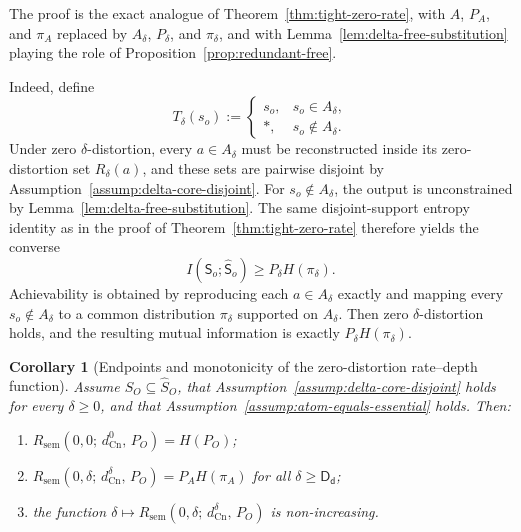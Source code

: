 \documentclass[journal,onecolumn]{IEEEtran}
\makeatletter
\newcommand{\Cn}{\text{Cn}}
\newtheorem{corollary}{Corollary}[section]
\numberwithin{equation}{section}
\renewenvironment{proof}[1][\proofname]{\par
  \pushQED{\qed}%
  \normalfont \topsep6\p@\@plus6\p@\relax
  \trivlist
  \item[\hskip\labelsep
        \itshape
    #1\@addpunct{.}]\ignorespaces
}{%
  \popQED\endtrivlist\@endpefalse
}
\makeatother
\begin{document}
\begin{proof}[Proof sketch]
The proof is the exact analogue of
Theorem~\ref{thm:tight-zero-rate}, with
\(A\), \(P_A\), and \(\pi_A\) replaced by
\(A_\delta\), \(P_\delta\), and \(\pi_\delta\), and with
Lemma~\ref{lem:delta-free-substitution} playing the role of
Proposition~\ref{prop:redundant-free}.

Indeed, define
\[
  T_\delta(s_o)
  :=
  \begin{cases}
    s_o, & s_o\in A_\delta,\\
    *,   & s_o\notin A_\delta.
  \end{cases}
\]
Under zero \(\delta\)-distortion, every \(a\in A_\delta\) must be
reconstructed inside its zero-distortion set \(R_\delta(a)\), and
these sets are pairwise disjoint by
Assumption~\ref{assump:delta-core-disjoint}.
For \(s_o\notin A_\delta\), the output is unconstrained by
Lemma~\ref{lem:delta-free-substitution}.
The same disjoint-support entropy identity as in the proof of
Theorem~\ref{thm:tight-zero-rate} therefore yields the converse
\[
  I({\mathsf{S}}_o;\hat {\mathsf{S}}_o)\ge P_\delta H(\pi_\delta).
\]
Achievability is obtained by reproducing each \(a\in A_\delta\)
exactly and mapping every \(s_o\notin A_\delta\) to a common
distribution \(\pi_\delta\) supported on \(A_\delta\).
Then zero \(\delta\)-distortion holds, and the resulting mutual
information is exactly \(P_\delta H(\pi_\delta)\).
\end{proof}

\begin{corollary}[Endpoints and monotonicity of the zero-distortion
rate--depth function]
\label{cor:rate-depth-endpoints}
Assume \(S_O\subseteq\hat S_O\), that
Assumption~\ref{assump:delta-core-disjoint} holds for every
\(\delta\ge 0\), and that
Assumption~\ref{assump:atom-equals-essential} holds.
Then:
\begin{enumerate}[label=\textup{(\roman*)}]
  \item \(R_{\mathrm{sem}}(0,0;\,d_{\Cn}^{0},\,P_O)=H(P_O)\);
  \item \(R_{\mathrm{sem}}(0,\delta;\,d_{\Cn}^{\delta},\,P_O)
        =P_AH(\pi_A)\) for all \(\delta\ge \mathsf{D_d}\);
  \item the function
        \(\delta\mapsto
        R_{\mathrm{sem}}(0,\delta;\,d_{\Cn}^{\delta},\,P_O)\)
        is non-increasing.
\end{enumerate}
\end{corollary}
\end{document}
